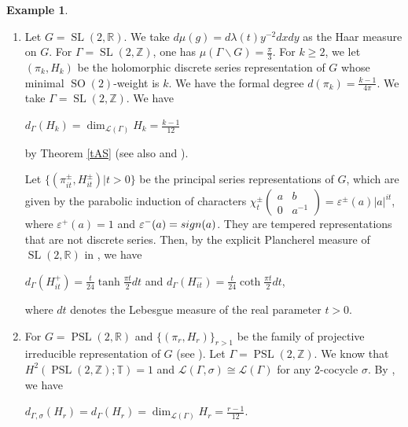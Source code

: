 \documentclass[11pt]{article}
\theoremstyle{plain}
\theoremstyle{remark}
\theoremstyle{definition}
\newtheorem{example}[theorem]{Example}
\DeclareMathOperator{\SL}{SL}
\DeclareMathOperator{\PSL}{PSL}
\DeclareMathOperator{\SO}{SO}
\begin{document}
\begin{example}
\begin{enumerate}
    \item Let $G=\SL(2,\mathbb{R})$. 
We take $d\mu(g)=d\lambda(t) y^{-2}dx dy$ as the Haar measure on $G$. 
For $\Gamma=\SL(2,\mathbb{Z})$, one has $\mu(\Gamma\backslash G)=\frac{\pi}{3}$. 
For $k\geq 2$, we let $(\pi_k,H_{k})$ be the holomorphic discrete series representation of $G$ whose minimal $\SO(2)$-weight is $k$. 
We have the formal degree $d(\pi_k)=\frac{k-1}{4\pi}$. 
We take $\Gamma=\SL(2,\mathbb{Z})$. 
We have
\begin{center}
    $d_{\Gamma}(H_k)=\dim_{\mathcal{L}(\Gamma)}H_k=\frac{k-1}{12}$
\end{center}
by Theorem \ref{tAS} (see also \cite[Example 3.3.4]{GHJ} and \cite[\S 6]{Ra14}). 

Let $\{(\pi^{\pm}_{it},H_{it}^{\pm})|t>0\}$ be the principal series representations of $G$, which are given by the parabolic induction of characters $\chi_t^{\pm}\begin{pmatrix}
a & b\\
0 & a^{-1}
\end{pmatrix}=\varepsilon^{\pm}(a)|a|^{it}$, where $\varepsilon^{+}(a)=1$
and $\varepsilon^{-}(a)={\rm sign}(a)$.  
They are tempered representations that are not discrete series. 
Then, by the explicit Plancherel measure of $\SL(2,\mathbb{R})$ in \cite[\S 7.6]{Fo2}, we have
\begin{center}
    $d_{\Gamma}(H_{it}^{+})=\frac{t}{24}\tanh\frac{\pi t}{2}dt$ and $d_{\Gamma}(H_{it}^{-})=\frac{t}{24}\coth\frac{\pi t}{2}dt$,
\end{center}
where $dt$ denotes the Lebesgue measure of the real parameter $t>0$.

\item For $G=\PSL(2,\mathbb{R})$ and $\{(\pi_r,H_r)\}_{r>1}$ be the family of projective irreducible representation of $G$ (see \cite[Definition 1.1]{Ra98}). 
Let $\Gamma=\PSL(2,\mathbb{Z})$. 
We know that $H^2(\PSL(2,\mathbb{Z});\mathbb{T})=1$ and $\mathcal{L}(\Gamma,\sigma)\cong \mathcal{L}(\Gamma)$ for any $2$-cocycle $\sigma$.
By \cite[Theorem 3.2]{Ra98}, we have
\begin{center}
    $d_{\Gamma,\sigma}(H_r)=d_{\Gamma}(H_r)=\dim_{\mathcal{L}(\Gamma)}H_r=\frac{r-1}{12}$. 
\end{center}
\end{enumerate}
\end{example}
\end{document}
